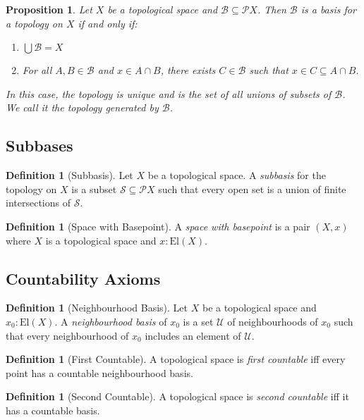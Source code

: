 \documentclass{book}
\newtheorem{prop}[ax]{Proposition}
\theoremstyle{definition}
\newtheorem{df}[ax]{Definition}
\newcommand{\El}[1]{\ensuremath{\mathrm{El} \left( {#1} \right)}}
\begin{document}
\begin{prop}
Let $X$ be a topological space and $\mathcal{B} \subseteq \mathcal{P} X$. Then $\mathcal{B}$ is a basis for a topology on $X$ if and only if:
\begin{enumerate}
\item $\bigcup \mathcal{B} = X$
\item For all $A, B \in \mathcal{B}$ and $x \in A \cap B$, there exists $C \in \mathcal{B}$ such that $x \in C \subseteq A \cap B$.
\end{enumerate}
In this case, the topology is unique and is the set of all unions of subsets of $\mathcal{B}$. We call it the topology \emph{generated} by $\mathcal{B}$.
\end{prop}

\subsection{Subbases}

\begin{df}[Subbasis]
Let $X$ be a topological space. A \emph{subbasis} for the topology on $X$ is a subset $\mathcal{S} \subseteq \mathcal{P} X$ such that every open set is a union of finite intersections of $\mathcal{S}$.
\end{df}

\begin{df}[Space with Basepoint]
A \emph{space with basepoint} is a pair $(X,x)$ where $X$ is a topological space and $x : \El{X}$.
\end{df}

\subsection{Countability Axioms}

\begin{df}[Neighbourhood Basis]
Let $X$ be a topological space and $x_0 : \El{X}$. A \emph{neighbourhood basis} of $x_0$ is a set $\mathcal{U}$ of neighbourhoods of $x_0$ such that every neighbourhood of $x_0$ includes an element of $\mathcal{U}$.
\end{df}

\begin{df}[First Countable]
A topological space is \emph{first countable} iff every point has a countable neighbourhood basis.
\end{df}

\begin{df}[Second Countable]
A topological space is \emph{second countable} iff it has a countable basis.
\end{df}
\end{document}
